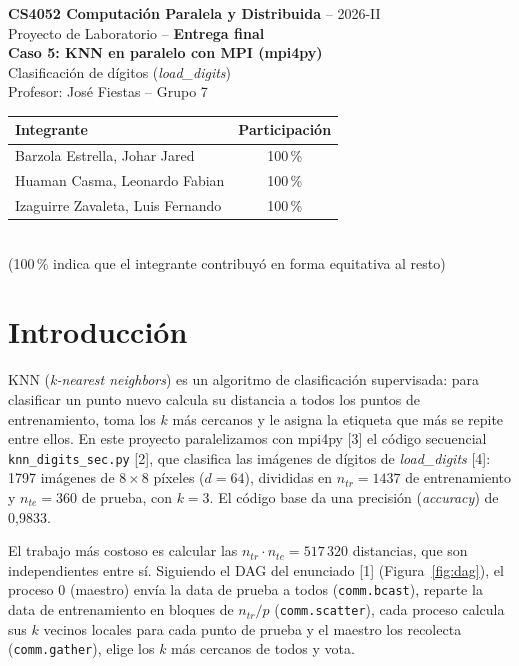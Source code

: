 \documentclass[11pt,a4paper]{article}
\newcommand{\ntr}{n_{tr}}
\newcommand{\nte}{n_{te}}
\begin{document}
\begin{center}
{\large \textbf{CS4052 Computación Paralela y Distribuida} -- 2026-II}\\[2pt]
Proyecto de Laboratorio -- \textbf{Entrega final}\\[10pt]
{\LARGE \textbf{Caso 5: KNN en paralelo con MPI (mpi4py)}}\\[4pt]
{\large Clasificación de dígitos (\textit{load\_digits})}\\[10pt]
Profesor: José Fiestas \quad -- \quad Grupo 7
\end{center}

\begin{table}[h]
\centering
\begin{tabular}{lc}
\toprule
\textbf{Integrante} & \textbf{Participación} \\
\midrule
Barzola Estrella, Johar Jared & 100\,\% \\
Huaman Casma, Leonardo Fabian & 100\,\% \\
Izaguirre Zavaleta, Luis Fernando & 100\,\% \\
\bottomrule
\end{tabular}
\\[3pt]
{\small (100\,\% indica que el integrante contribuyó en forma equitativa al resto)}
\end{table}

\section{Introducción}

KNN (\textit{k-nearest neighbors}) es un algoritmo de clasificación supervisada: para clasificar un punto nuevo calcula su distancia a todos los puntos de entrenamiento, toma los $k$ más cercanos y le asigna la etiqueta que más se repite entre ellos. En este proyecto paralelizamos con mpi4py [3] el código secuencial \texttt{knn\_digits\_sec.py} [2], que clasifica las imágenes de dígitos de \textit{load\_digits} [4]: 1797 imágenes de $8\times 8$ píxeles ($d = 64$), divididas en $\ntr = 1437$ de entrenamiento y $\nte = 360$ de prueba, con $k = 3$. El código base da una precisión (\textit{accuracy}) de 0,9833.

El trabajo más costoso es calcular las $\ntr\cdot\nte = 517\,320$ distancias, que son independientes entre sí. Siguiendo el DAG del enunciado [1] (Figura~\ref{fig:dag}), el proceso 0 (maestro) envía la data de prueba a todos (\texttt{comm.bcast}), reparte la data de entrenamiento en bloques de $\ntr/p$ (\texttt{comm.scatter}), cada proceso calcula sus $k$ vecinos locales para cada punto de prueba y el maestro los recolecta (\texttt{comm.gather}), elige los $k$ más cercanos de todos y vota.
\end{document}
